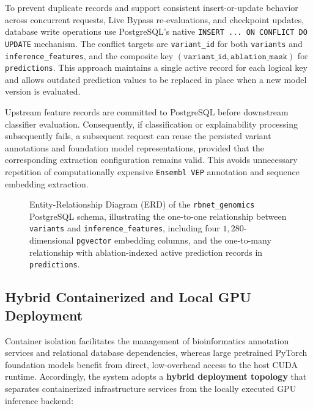 To prevent duplicate records and support consistent insert-or-update behavior across concurrent requests, Live Bypass re-evaluations, and checkpoint updates, database write operations use PostgreSQL's native \texttt{INSERT ... ON CONFLICT DO UPDATE} mechanism. The conflict targets are \texttt{variant\_id} for both \texttt{variants} and \texttt{inference\_features}, and the composite key $(\texttt{variant\_id}, \texttt{ablation\_mask})$ for \texttt{predictions}. This approach maintains a single active record for each logical key and allows outdated prediction values to be replaced in place when a new model version is evaluated.

Upstream feature records are committed to PostgreSQL before downstream classifier evaluation. Consequently, if classification or explainability processing subsequently fails, a subsequent request can reuse the persisted variant annotations and foundation model representations, provided that the corresponding extraction configuration remains valid. This avoids unnecessary repetition of computationally expensive \texttt{Ensembl VEP} annotation and sequence embedding extraction.

\begin{figure}[htbp]
    \centering
    \caption{Entity-Relationship Diagram (ERD) of the \texttt{rbnet\_genomics} PostgreSQL schema, illustrating the one-to-one relationship between \texttt{variants} and \texttt{inference\_features}, including four $1{,}280$-dimensional \texttt{pgvector} embedding columns, and the one-to-many relationship with ablation-indexed active prediction records in \texttt{predictions}.}
    \label{fig:db_erd}
\end{figure}

\subsection{Hybrid Containerized and Local GPU Deployment}

Container isolation facilitates the management of bioinformatics annotation services and relational database dependencies, whereas large pretrained PyTorch foundation models benefit from direct, low-overhead access to the host CUDA runtime. Accordingly, the system adopts a \textbf{hybrid deployment topology} that separates containerized infrastructure services from the locally executed GPU inference backend:

